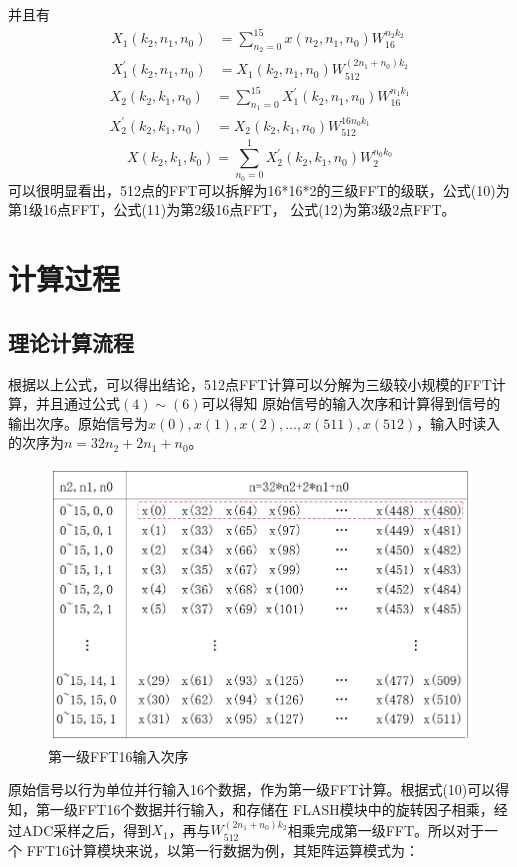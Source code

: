 \documentclass[12pt,a4paper]{article}
\begin{document}
并且有
\begin{equation}
\begin{aligned}
    X_1(k_2,n_1,n_0) &= \sum_{n_2=0}^{15} x(n_2,n_1,n_0)W_{16}^{n_2k_2} \\
    X_1^{'}(k_2,n_1,n_0) &= X_1(k_2,n_1,n_0) W_{512}^{(2n_1 + n_0)k_2}
\end{aligned}
\end{equation}
\begin{equation}
\begin{aligned}
    X_2(k_2,k_1,n_0) &= \sum_{n_1=0}^{15} X_1^{'}(k_2,n_1,n_0) W_{16}^{n_1k_1} \\
    X_2^{'}(k_2,k_1,n_0) &= X_2(k_2,k_1,n_0) W_{512}^{16n_0k_1}
\end{aligned}
\end{equation}
\begin{equation}
    X(k_2,k_1,k_0) = \sum_{n_0=0}^{1} X_2^{'}(k_2,k_1,n_0) W_{2}^{n_0k_0}
\end{equation}
可以很明显看出，512点的FFT可以拆解为16*16*2的三级FFT的级联，公式(10)为第1级16点FFT，公式(11)为第2级16点FFT，
公式(12)为第3级2点FFT。

\section{计算过程}
\subsection{理论计算流程}
根据以上公式，可以得出结论，512点FFT计算可以分解为三级较小规模的FFT计算，并且通过公式$(4) \sim (6)$可以得知
原始信号的输入次序和计算得到信号的输出次序。原始信号为$x(0), x(1), x(2), ..., x(511), x(512)$，输入时读入
的次序为$n=32n_2+2n_1+n_0$。

\begin{figure}[h]
\centering
\includegraphics[scale=0.6]{figures/figure1}
\caption{第一级FFT16输入次序}
\end{figure}
原始信号以行为单位并行输入16个数据，作为第一级FFT计算。根据式(10)可以得知，第一级FFT16个数据并行输入，和存储在
FLASH模块中的旋转因子相乘，经过ADC采样之后，得到$X_1$，再与$W_{512}^{(2n_1+n_0)k_2}$相乘完成第一级FFT。所以对于一个
FFT16计算模块来说，以第一行数据为例，其矩阵运算模式为：
\end{document}
